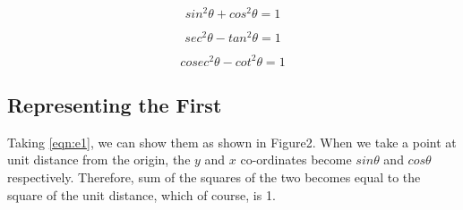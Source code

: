 \documentclass[14pt]{article}
\begin{document}
\begin{equation}
	sin^2\theta + cos^2\theta = 1
	\label{eqn:e1}
\end{equation}

\begin{equation}
	sec^2\theta - tan^2\theta = 1 
	\label{eqn:e2}
\end{equation}

\begin{equation}
	cosec^2\theta - cot^2\theta = 1
	\label{eqn:e3}
\end{equation}

\subsection{Representing the First}
Taking \ref{eqn:e1}, we can show them as shown in Figure2. When we take a point at
unit distance from the origin, the $y$ and $x$ co-ordinates become $sin\theta$ and $cos\theta$
respectively. Therefore, sum of the squares of the two becomes equal to the
square of the unit distance, which of course, is 1.
\end{document}
